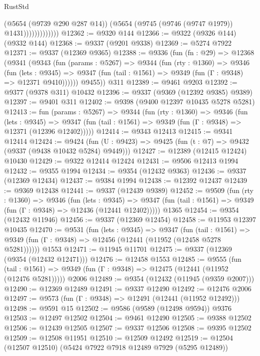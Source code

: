 \begin{lexlean}{RustStd}
\begin{coremodule}
                          (@5654 (@9739 @290 @287 @14))
                          (@5654 (@9745 (@9746 (@9747 @1979)) @1431)))))))))))))
@12362 := @9320 @144
@12366 := @9322 (@9326 @144) (@9332 @144)
@12368 := @9337 (@9201 @9338)
@12369 := @5274 @7922
@12371 := @9337 (@12369 @9365)
@12388 := @9336
    (fun (fn : @29) =>
    @12368
      (@9341
        (@9343
          (fun (params : @5267) =>
          @9344
            (fun (rty : @1360) =>
            @9346
              (fun (lets : @9345) =>
              @9347 (fun (tail : @1561) => @9349 (fun (Γ : @9348) => @12371 @9410))))))
        @9455))
    @311
@12389 := @9461 @9203
@12392 := @9377 (@9378 @311) @10432
@12396 := @9337 (@9369 (@12392 @9385) @9389)
@12397 := @9401 @311
@12402 := @9398 (@9400 @12397 @10435 @5278 @5281)
@12413 := fun (params : @5267) =>
  @9344
    (fun (rty : @1360) =>
    @9346
      (fun (lets : @9345) =>
      @9347 (fun (tail : @1561) => @9349 (fun (Γ : @9348) => @12371 (@12396 @12402)))))
@12414 := @9343 @12413
@12415 := @9341 @12414
@12424 := @9424
    (fun (U : @9423) => @9425 (fun (t : @7) => @9432 (@9337 (@9438 @10432 @5284) @9449)))
@12427 := @12389 (@12415 @12424) @10430
@12429 := @9322 @12414 @12424
@12431 := @9506 @12413 @1994
@12432 := @9355 @1994
@12434 := @9354 (@12432 @9363)
@12436 := @9337 (@12369 @12434)
@12437 := @9384 @1994
@12438 := @12392 @12437
@12439 := @9369 @12438
@12441 := @9337 (@12439 @9389)
@12452 := @9509
    (fun (rty : @1360) =>
    @9346
      (fun (lets : @9345) =>
      @9347 (fun (tail : @1561) => @9349 (fun (Γ : @9348) => @12436 (@12441 @12402)))))
    @1365
@12454 := @9354 (@12432 @11946)
@12456 := @9337 (@12369 @12454)
@12458 := @11953 @12397 @10435
@12470 := @9531
    (fun (lets : @9345) =>
    @9347
      (fun (tail : @1561) =>
      @9349 (fun (Γ : @9348) => @12456 (@12441 (@11952 (@12458 @5278 @5281))))))
    @1553
@12471 := @11945 @11701
@12475 := @9337 (@12369 (@9354 (@12432 @12471)))
@12476 := @12458 @1553
@12485 := @9555
    (fun (tail : @1561) => @9349 (fun (Γ : @9348) => @12475 (@12441 (@11952 (@12476 @5281)))))
    @2006
@12489 := @9354 (@12432 (@11945 (@9359 @2007)))
@12490 := @12369 @12489
@12491 := @9337 @12490
@12492 := @12476 @2006
@12497 := @9573 (fun (Γ : @9348) => @12491 (@12441 (@11952 @12492)))
@12498 := @9591 @15
@12502 := @9586 (@9589 (@12498 @9594)) @9376
@12503 := @12497 @12502
@12504 := @9461 @12490
@12505 := @9388 @12502
@12506 := @12439 @12505
@12507 := @9337 @12506
@12508 := @9395 @12502
@12509 := @12508 @11951
@12510 := @12509 @12492
@12519 := @12504 (@12507 @12510) (@5424 @7922 @7918 @12489 @7929 (@5295 @12489))

\end{coremodule}
\end{lexlean}
